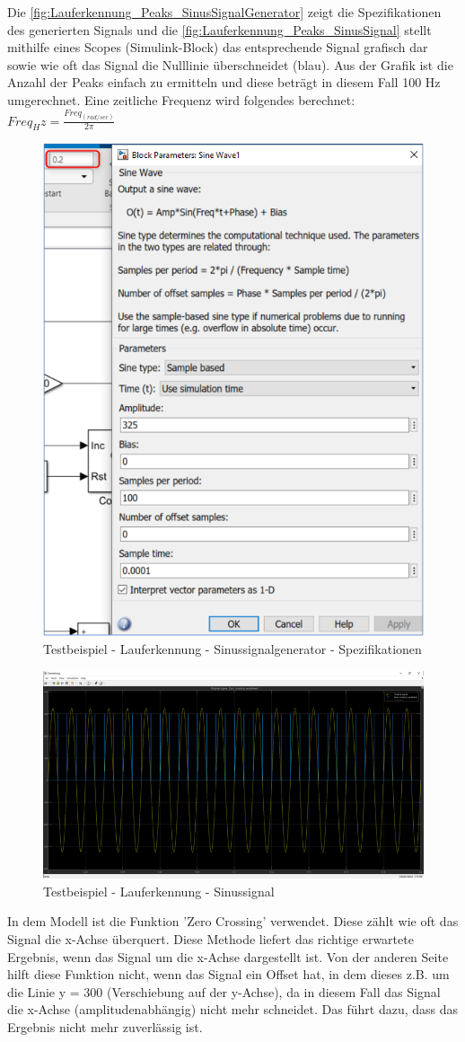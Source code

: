 Die \autoref{fig:Lauferkennung_Peaks_SinusSignalGenerator} zeigt die Spezifikationen des generierten Signals und die \autoref{fig:Lauferkennung_Peaks_SinusSignal} stellt mithilfe eines Scopes (Simulink-Block) das entsprechende Signal grafisch dar sowie wie oft das Signal die Nulllinie überschneidet (blau). Aus der Grafik ist die Anzahl der Peaks einfach zu ermitteln und diese beträgt in diesem Fall 100 Hz umgerechnet.
Eine zeitliche Frequenz wird folgendes berechnet:\\
$Freq_Hz = \frac{Freq_(rad/sec)}{2\pi}$
\begin{figure}[H]
	\centering
	\includegraphics[width=0.5\linewidth]{Bilder/Lauferkennung_Peaks_SinusSignalGenerator.png}
	\caption{Testbeispiel - Lauferkennung - Sinussignalgenerator - Spezifikationen}
	\label{fig:Lauferkennung_Peaks_SinusSignalGenerator}
\end{figure}
\begin{figure}[H]
	\centering
	\includegraphics[width=\linewidth]{Bilder/Lauferkennung_Peaks_SinusSignal.png}
	\caption{Testbeispiel - Lauferkennung - Sinussignal}
	\label{fig:Lauferkennung_Peaks_SinusSignal}
\end{figure}
In dem Modell ist die Funktion 'Zero Crossing' verwendet. Diese zählt wie oft das Signal die x-Achse überquert. Diese Methode liefert das richtige erwartete Ergebnis, wenn das Signal um die x-Achse dargestellt ist. Von der anderen Seite hilft diese Funktion nicht, wenn das Signal ein Offset hat, in dem dieses z.B. um die Linie y = 300 (Verschiebung auf der y-Achse), da in diesem Fall das Signal die x-Achse (amplitudenabhängig) nicht mehr schneidet. Das führt dazu, dass das Ergebnis nicht mehr zuverlässig ist.

